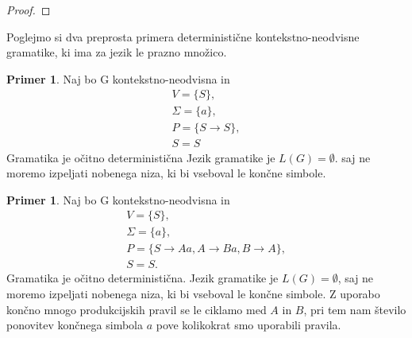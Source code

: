 \documentclass{amsart}
\theoremstyle{definition}
\newtheorem{primer}[definicija]{Primer}
\theoremstyle{plain} %
\begin{document}
\begin{proof}


    
\end{proof}

Poglejmo si dva preprosta primera deterministične kontekstno-neodvisne gramatike, ki ima za jezik le prazno množico.

\begin{primer}
    Naj bo G kontekstno-neodvisna in 
    \begin{gather*}
        V = \{ S \}, \\
        \Sigma = \{ a \}, \\
        P = \{ S \rightarrow S \}, \\
        S = S
    \end{gather*}
    Gramatika je očitno deterministična Jezik gramatike je $ L(G) = \emptyset $. saj ne moremo izpeljati
    nobenega niza, ki bi vseboval le končne simbole.
\end{primer}

\begin{primer}\label{deterministična}
    Naj bo G kontekstno-neodvisna in 
    \begin{gather*}
        V = \{ S \}, \\
        \Sigma = \{ a \}, \\
        P = \{ S \rightarrow Aa, A \rightarrow Ba, B \rightarrow A \}, \\
        S = S.
    \end{gather*}
    Gramatika je očitno deterministična. Jezik gramatike je $ L(G) = \emptyset $, saj ne moremo izpeljati
    nobenega niza, ki bi vseboval le končne simbole. Z uporabo končno mnogo produkcijskih pravil se le 
    ciklamo med $A$ in $B$, pri tem nam število ponovitev končnega simbola $a$ pove kolikokrat smo uporabili
    pravila.
\end{primer}
\end{document}
